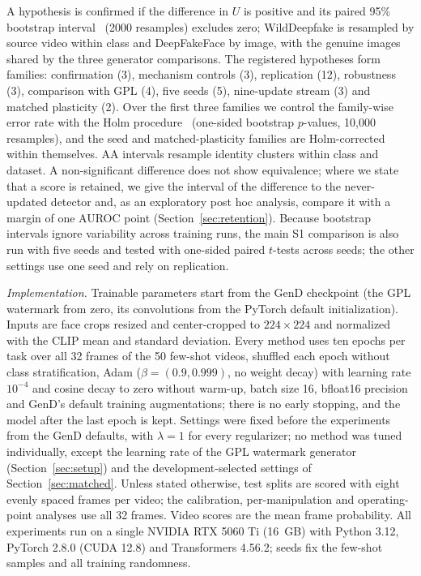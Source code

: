 \documentclass[journal]{IEEEtran}
\begin{document}
A hypothesis is confirmed if the difference in $U$ is positive and its paired 95\% bootstrap interval~\cite{efron1994bootstrap} (2000 resamples) excludes zero; WildDeepfake is resampled by source video within class and DeepFakeFace by image, with the genuine images shared by the three generator comparisons. The registered hypotheses form families: confirmation (3), mechanism controls (3), replication (12), robustness (3), comparison with GPL (4), five seeds (5), nine-update stream (3) and matched plasticity (2). Over the first three families we control the family-wise error rate with the Holm procedure~\cite{holm1979} (one-sided bootstrap $p$-values, 10{,}000 resamples), and the seed and matched-plasticity families are Holm-corrected within themselves. AA intervals resample identity clusters within class and dataset. A non-significant difference does not show equivalence; where we state that a score is retained, we give the interval of the difference to the never-updated detector and, as an exploratory post hoc analysis, compare it with a margin of one AUROC point (Section~\ref{sec:retention}). Because bootstrap intervals ignore variability across training runs, the main S1 comparison is also run with five seeds and tested with one-sided paired $t$-tests across seeds; the other settings use one seed and rely on replication.

\textit{Implementation.} Trainable parameters start from the GenD checkpoint (the GPL watermark from zero, its convolutions from the PyTorch default initialization). Inputs are face crops resized and center-cropped to $224\times224$ and normalized with the CLIP mean and standard deviation. Every method uses ten epochs per task over all 32 frames of the 50 few-shot videos, shuffled each epoch without class stratification, Adam ($\beta=(0.9,0.999)$, no weight decay) with learning rate $10^{-4}$ and cosine decay to zero without warm-up, batch size 16, bfloat16 precision and GenD's default training augmentations; there is no early stopping, and the model after the last epoch is kept. Settings were fixed before the experiments from the GenD defaults, with $\lambda=1$ for every regularizer; no method was tuned individually, except the learning rate of the GPL watermark generator (Section~\ref{sec:setup}) and the development-selected settings of Section~\ref{sec:matched}. Unless stated otherwise, test splits are scored with eight evenly spaced frames per video; the calibration, per-manipulation and operating-point analyses use all 32 frames. Video scores are the mean frame probability. All experiments run on a single NVIDIA RTX 5060 Ti (16~GB) with Python 3.12, PyTorch 2.8.0 (CUDA 12.8) and Transformers 4.56.2; seeds fix the few-shot samples and all training randomness.
\end{document}
